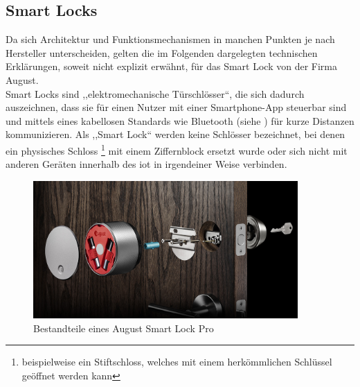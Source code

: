 \subsection{Smart Locks}
\label{sec:sota_smart_locks}
	Da sich Architektur und Funktionsmechanismen in manchen Punkten je nach Hersteller unterscheiden, gelten die im Folgenden dargelegten technischen Erklärungen, soweit nicht explizit erwähnt, für das Smart Lock von der Firma August. 
    \medskip\\
    \noindent Smart Locks sind ,,elektromechanische Türschlösser``, die sich dadurch auszeichnen, dass sie für einen Nutzer mit einer Smartphone-App steuerbar sind und mittels eines kabellosen Standards wie Bluetooth (siehe ) für kurze Distanzen kommunizieren.
	Als ,,Smart Lock`` werden keine Schlösser bezeichnet, bei denen ein physisches Schloss
	\footnote{beispielweise ein Stiftschloss, welches mit einem herkömmlichen Schlüssel geöffnet werden kann} 
	mit einem Ziffernblock ersetzt wurde oder sich nicht mit anderen Geräten innerhalb des \gls{iot} in irgendeiner Weise verbinden.\cite{Ho2016}
	
	\begin{figure}[H]
		\centering
		\includegraphics[width=0.9\textwidth]{graphics/august_2.jpg}
		\caption{Bestandteile eines August Smart Lock Pro\cite{August}}
		\label{fig:august1}
	\end{figure}
	
